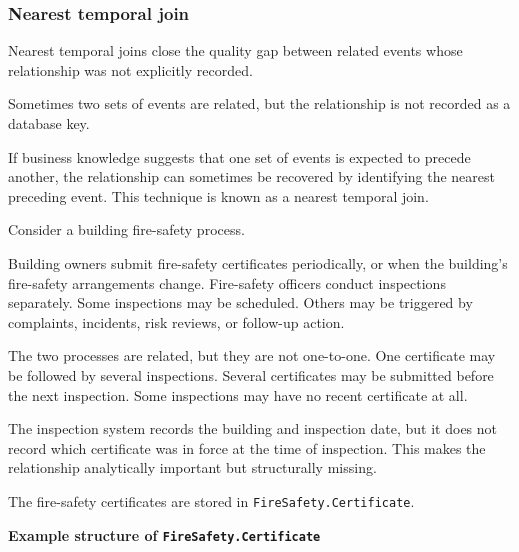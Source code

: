 \documentclass[10pt,openany,10pt]{book}
\begin{document}
\subsubsection{Nearest temporal join}\label{nearest-temporal-join}

Nearest temporal joins close the quality gap between related events
whose relationship was not explicitly recorded.

Sometimes two sets of events are related, but the relationship is not
recorded as a database key.

If business knowledge suggests that one set of events is expected to
precede another, the relationship can sometimes be recovered by
identifying the nearest preceding event. This technique is known as a
nearest temporal join.

Consider a building fire-safety process.

Building owners submit fire-safety certificates periodically, or when
the building's fire-safety arrangements change. Fire-safety officers
conduct inspections separately. Some inspections may be scheduled.
Others may be triggered by complaints, incidents, risk reviews, or
follow-up action.

The two processes are related, but they are not one-to-one. One
certificate may be followed by several inspections. Several certificates
may be submitted before the next inspection. Some inspections may have
no recent certificate at all.

The inspection system records the building and inspection date, but it
does not record which certificate was in force at the time of
inspection. This makes the relationship analytically important but
structurally missing.

The fire-safety certificates are stored in
\texttt{FireSafety.Certificate}.

\textbf{Example structure of \texttt{FireSafety.Certificate}}
\end{document}
